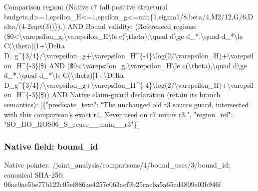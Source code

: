 \documentclass[10pt,a4paper]{article}
\begin{document}
\begingroup\raggedright\sloppy Comparison region:\allowbreak{} (Native r7 (all positive structural budgets,\allowbreak{}d>=\allowbreak{}1,\allowbreak{}epsilon\_\allowbreak{}H<=\allowbreak{}1,\allowbreak{}epsilon\_\allowbreak{}g<=\allowbreak{}min\{1,\allowbreak{}sigma1/\allowbreak{}8,\allowbreak{}beta/\allowbreak{}4,\allowbreak{}M2/\allowbreak{}12,\allowbreak{}G/\allowbreak{}6,\allowbreak{}Delta/\allowbreak{}(4-2sqrt(3))\}).) AND Bound validity:\allowbreak{} (Referenced regions:\allowbreak{} (\$0<\textbackslash{}varepsilon\_\allowbreak{}g,\allowbreak{}\textbackslash{}varepsilon\_\allowbreak{}H\textbackslash{}le c(\textbackslash{}theta),\allowbreak{}\textbackslash{}quad d\textbackslash{}ge d\_\allowbreak{}*,\allowbreak{}\textbackslash{}quad d\_\allowbreak{}*\textbackslash{}le C(\textbackslash{}theta)[1+\textbackslash{}Delta D\_\allowbreak{}g\textasciicircum{}\{3/\allowbreak{}4\}/\allowbreak{}\textbackslash{}varepsilon\_\allowbreak{}g+\textbackslash{}varepsilon\_\allowbreak{}H\textasciicircum{}\{-4\}\textbackslash{}log(2/\allowbreak{}\textbackslash{}varepsilon\_\allowbreak{}H)+\textbackslash{}varepsilon\_\allowbreak{}H\textasciicircum{}\{-3\}]\$) AND (\$0<\textbackslash{}varepsilon\_\allowbreak{}g,\allowbreak{}\textbackslash{}varepsilon\_\allowbreak{}H\textbackslash{}le c(\textbackslash{}theta),\allowbreak{}\textbackslash{}quad d\textbackslash{}ge d\_\allowbreak{}*,\allowbreak{}\textbackslash{}quad d\_\allowbreak{}*\textbackslash{}le C(\textbackslash{}theta)[1+\textbackslash{}Delta D\_\allowbreak{}g\textasciicircum{}\{3/\allowbreak{}4\}/\allowbreak{}\textbackslash{}varepsilon\_\allowbreak{}g+\textbackslash{}varepsilon\_\allowbreak{}H\textasciicircum{}\{-4\}\textbackslash{}log(2/\allowbreak{}\textbackslash{}varepsilon\_\allowbreak{}H)+\textbackslash{}varepsilon\_\allowbreak{}H\textasciicircum{}\{-3\}]\$)) AND Native claim-guard declaration (retain its branch semantics):\allowbreak{} [\{"predicate\_\allowbreak{}text":\allowbreak{} "The unchanged old r3 source guard,\allowbreak{} intersected with this comparison's exact r7. Never used on r7 minus r3.",\allowbreak{} "region\_\allowbreak{}ref":\allowbreak{} "SO\_\allowbreak{}HO\_\allowbreak{}HOS06\_\allowbreak{}S\_\allowbreak{}reuse\_\allowbreak{}\_\allowbreak{}main\_\allowbreak{}\_\allowbreak{}r3"\}]\par\endgroup

\subsubsection{Native field: bound\_\allowbreak{}id}
Native pointer: /joint\_\allowbreak{}analysis/comparisons/4/bound\_\allowbreak{}uses/3/bound\_\allowbreak{}id; canonical SHA-256: 06ac0ae5be77b122c05ef886ae4257c063acf9b25cae6a5a65cd4809e03b946f
\end{document}
